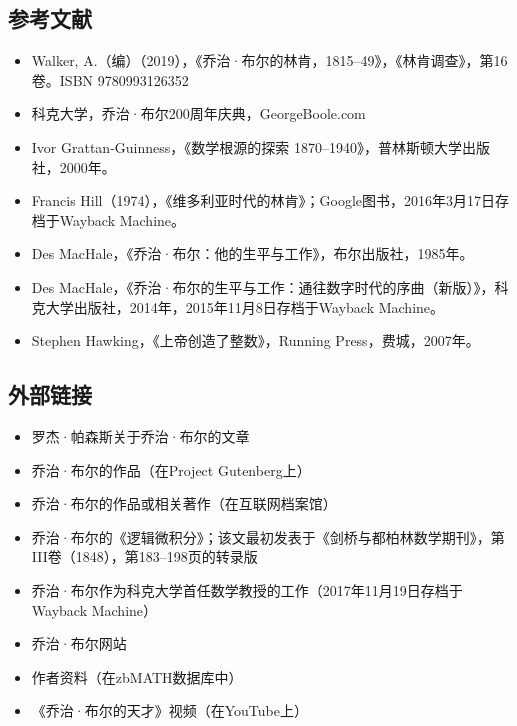 \subsection{参考文献}
\begin{itemize}
\item Walker, A.（编）（2019），《乔治·布尔的林肯，1815–49》，《林肯调查》，第16卷。ISBN 9780993126352
\item 科克大学，乔治·布尔200周年庆典，GeorgeBoole.com
\item Ivor Grattan-Guinness，《数学根源的探索 1870–1940》，普林斯顿大学出版社，2000年。
\item Francis Hill（1974），《维多利亚时代的林肯》；Google图书，2016年3月17日存档于Wayback Machine。
\item Des MacHale，《乔治·布尔：他的生平与工作》，布尔出版社，1985年。
\item Des MacHale，《乔治·布尔的生平与工作：通往数字时代的序曲（新版）》，科克大学出版社，2014年，2015年11月8日存档于Wayback Machine。
\item Stephen Hawking，《上帝创造了整数》，Running Press，费城，2007年。
\end{itemize}
\subsection{外部链接}
\begin{itemize}
\item 罗杰·帕森斯关于乔治·布尔的文章  
\item 乔治·布尔的作品（在Project Gutenberg上）  
\item 乔治·布尔的作品或相关著作（在互联网档案馆）  
\item 乔治·布尔的《逻辑微积分》；该文最初发表于《剑桥与都柏林数学期刊》，第III卷（1848），第183–198页的转录版  
\item 乔治·布尔作为科克大学首任数学教授的工作（2017年11月19日存档于Wayback Machine）  
\item 乔治·布尔网站  
\item 作者资料（在zbMATH数据库中）  
\item 《乔治·布尔的天才》视频（在YouTube上）
\end{itemize}